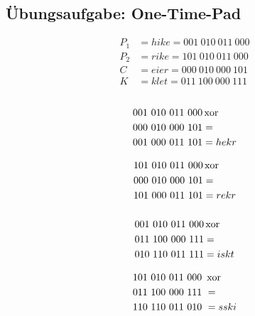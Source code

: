 \subsubsection{}
\subsubsection{}

\subsection{Übungsaufgabe: One-Time-Pad}

\begin{align}
P_1 &= hike = 001~ 010~ 011~ 000  \\
P_2 &= rike = 101~ 010~ 011~ 000  \\
C   &= eier = 000~ 010~ 000~ 101  \\
K   &= klet = 011~ 100~ 000~ 111  \\
\end{align}

\subsubsection{}

\begin{align}
 001~ 010~ 011~ 000 &\operatorname*{xor} \\
 000~ 010~ 000~ 101 &=   \\
 001~ 000~ 011~ 101 &= hekr
\end{align}

\begin{align}
 101~ 010~ 011~ 000 &\operatorname*{xor} \\
 000~ 010~ 000~ 101 &=   \\
 101~ 000~ 011~ 101 &= rekr
\end{align}

\subsubsection{}

\begin{align}
 001~ 010~ 011~ 000 &\operatorname*{xor} \\
 011~ 100~ 000~ 111 &=   \\
 010~ 110~ 011~ 111 &= iskt
\end{align}

\begin{align}
 101~ 010~ 011~ 000~ &\operatorname*{xor} \\
 011~ 100~ 000~ 111~ &=   \\
 110~ 110~ 011~ 010~ &= sski
\end{align}

